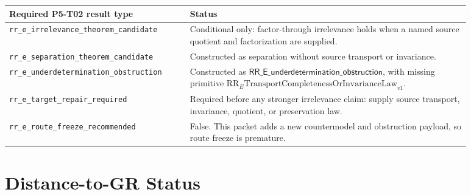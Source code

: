 \documentclass[11pt]{article}
\newcommand{\RRUnder}{\mathsf{RR\_E\_underdetermination\_obstruction}}
\newcommand{\RRMissing}{\mathrm{RR}_{E}\mathrm{TransportCompletenessOrInvarianceLaw}_{v1}}
\begin{document}
\begin{longtable}{p{0.34\linewidth}p{0.54\linewidth}}
\toprule
Required P5-T02 result type & Status \\
\midrule
\texttt{rr\_e\_irrelevance\_theorem\_candidate} &
Conditional only: factor-through irrelevance holds when a named source quotient
and factorization are supplied. \\
\texttt{rr\_e\_separation\_theorem\_candidate} &
Constructed as separation without source transport or invariance. \\
\texttt{rr\_e\_underdetermination\_obstruction} &
Constructed as \(\RRUnder\), with missing primitive \(\RRMissing\). \\
\texttt{rr\_e\_target\_repair\_required} &
Required before any stronger irrelevance claim: supply source transport,
invariance, quotient, or preservation law. \\
\texttt{rr\_e\_route\_freeze\_recommended} &
False. This packet adds a new countermodel and obstruction payload, so route
freeze is premature. \\
\bottomrule
\end{longtable}

\section{Distance-to-GR Status}
\end{document}
